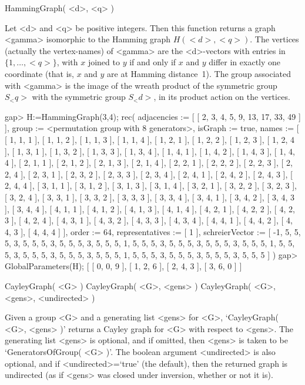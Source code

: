 
\>HammingGraph( <d>, <q> )

Let <d> and <q> be positive integers.  Then this function returns a
graph <gamma> isomorphic to the Hamming graph $H(<d>,<q>)$.  The vertices
(actually the vertex-names) of <gamma> are the <d>-vectors with entries
in $\{1,\ldots,<q>\}$, with $x$ joined to $y$ if and only if $x$ and $y$
differ in exactly one coordinate (that is, $x$ and $y$ are at Hamming
distance~1).  The group associated with <gamma> is the image of the wreath
product of the symmetric group $S_<q>$ with the symmetric group $S_<d>$,
in its product action on the vertices.

\beginexample
gap> H:=HammingGraph(3,4);
rec( adjacencies := [ [ 2, 3, 4, 5, 9, 13, 17, 33, 49 ] ], 
  group := <permutation group with 8 generators>, isGraph := true, 
  names := [ [ 1, 1, 1 ], [ 1, 1, 2 ], [ 1, 1, 3 ], [ 1, 1, 4 ], 
      [ 1, 2, 1 ], [ 1, 2, 2 ], [ 1, 2, 3 ], [ 1, 2, 4 ], [ 1, 3, 1 ], 
      [ 1, 3, 2 ], [ 1, 3, 3 ], [ 1, 3, 4 ], [ 1, 4, 1 ], [ 1, 4, 2 ], 
      [ 1, 4, 3 ], [ 1, 4, 4 ], [ 2, 1, 1 ], [ 2, 1, 2 ], [ 2, 1, 3 ], 
      [ 2, 1, 4 ], [ 2, 2, 1 ], [ 2, 2, 2 ], [ 2, 2, 3 ], [ 2, 2, 4 ], 
      [ 2, 3, 1 ], [ 2, 3, 2 ], [ 2, 3, 3 ], [ 2, 3, 4 ], [ 2, 4, 1 ], 
      [ 2, 4, 2 ], [ 2, 4, 3 ], [ 2, 4, 4 ], [ 3, 1, 1 ], [ 3, 1, 2 ], 
      [ 3, 1, 3 ], [ 3, 1, 4 ], [ 3, 2, 1 ], [ 3, 2, 2 ], [ 3, 2, 3 ], 
      [ 3, 2, 4 ], [ 3, 3, 1 ], [ 3, 3, 2 ], [ 3, 3, 3 ], [ 3, 3, 4 ], 
      [ 3, 4, 1 ], [ 3, 4, 2 ], [ 3, 4, 3 ], [ 3, 4, 4 ], [ 4, 1, 1 ], 
      [ 4, 1, 2 ], [ 4, 1, 3 ], [ 4, 1, 4 ], [ 4, 2, 1 ], [ 4, 2, 2 ], 
      [ 4, 2, 3 ], [ 4, 2, 4 ], [ 4, 3, 1 ], [ 4, 3, 2 ], [ 4, 3, 3 ], 
      [ 4, 3, 4 ], [ 4, 4, 1 ], [ 4, 4, 2 ], [ 4, 4, 3 ], [ 4, 4, 4 ] ], 
  order := 64, representatives := [ 1 ], 
  schreierVector := [ -1, 5, 5, 5, 3, 5, 5, 5, 3, 5, 5, 5, 3, 5, 5, 5, 1, 5, 
      5, 5, 3, 5, 5, 5, 3, 5, 5, 5, 3, 5, 5, 5, 1, 5, 5, 5, 3, 5, 5, 5, 3, 
      5, 5, 5, 3, 5, 5, 5, 1, 5, 5, 5, 3, 5, 5, 5, 3, 5, 5, 5, 3, 5, 5, 5 ] )
gap> GlobalParameters(H);
[ [ 0, 0, 9 ], [ 1, 2, 6 ], [ 2, 4, 3 ], [ 3, 6, 0 ] ]
\endexample


\>CayleyGraph( <G> )
\>CayleyGraph( <G>, <gens> )
\>CayleyGraph( <G>, <gens>, <undirected> )
 
Given a group <G> and a generating list <gens> for  <G>, `CayleyGraph(
<G>, <gens> )' returns a Cayley graph for  <G>  with respect to <gens>.
The generating list <gens> is optional, and if omitted, then <gens> is
taken to be `GeneratorsOfGroup( <G> )'. The boolean argument <undirected>
is also optional, and if <undirected>=`true' (the default), then the
returned graph is undirected (as if <gens> was closed under inversion,
whether or not it is).


